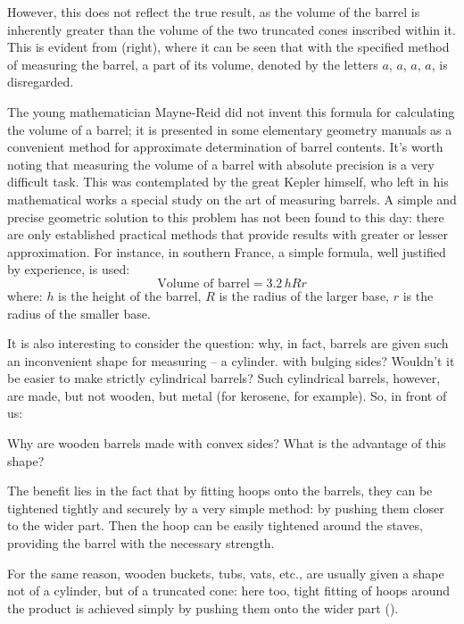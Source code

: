 However, this does not reflect the true result, as the volume of the barrel is inherently greater than the volume of the two truncated cones inscribed within it. This is evident from  (right), where it can be seen that with the specified method of measuring the barrel, a part of its volume, denoted by the letters $a$, $a$, $a$, $a$, is disregarded.


The young mathematician Mayne-Reid did not invent this formula for calculating the volume of a barrel; it is presented in some elementary geometry manuals as a convenient method for approximate determination of barrel contents. It's worth noting that measuring the volume of a barrel with absolute precision is a very difficult task. This was contemplated by the great Kepler himself, who left in his mathematical works a special study on the art of measuring barrels. A simple and precise geometric solution to this problem has not been found to this day: there are only established practical methods that provide results with greater or lesser approximation. For instance, in southern France, a simple formula, well justified by experience, is used:
\begin{equation*}%
\text{Volume of barrel} = 3.2\, hRr 
\end{equation*}
where: $h$ is the height of the barrel, $R$ is the radius of the larger base, $r$ is the radius of the smaller base.

It is also interesting to consider the question: why, in fact, barrels are given such an inconvenient shape for measuring -- a cylinder. with bulging sides? Wouldn't it be easier to make strictly cylindrical barrels? Such cylindrical barrels, however, are made, but not wooden, but metal (for kerosene, for example). So, in front of us:

\ques Why are wooden barrels made with convex sides? What is the advantage of this shape?

\ans The benefit lies in the fact that by fitting hoops onto the barrels, they can be tightened tightly and securely by a very simple method: by pushing them closer to the wider part. Then the hoop can be easily tightened around the staves, providing the barrel with the necessary strength.

For the same reason, wooden buckets, tubs, vats, etc., are usually given a shape not of a cylinder, but of a truncated cone: here too, tight fitting of hoops around the product is achieved simply by pushing them onto the wider part ().

